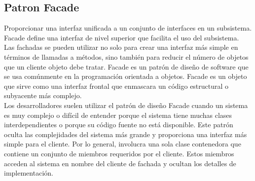 \documentclass[twoside,twocolumn]{article}
\begin{document}
\subsection{Patron Facade}
Proporcionar una interfaz unificada a un conjunto de interfaces en un subsistema. Facade define una interfaz de nivel superior que facilita el uso del subsistema.
\\
Las fachadas se pueden utilizar no solo para crear una interfaz más simple en términos
de llamadas a métodos, sino también para reducir el número de objetos que un cliente
objeto debe tratar. Facade es un patrón de diseño de software que se usa comúnmente en la programación orientada a objetos. Facade es un objeto que sirve como una interfaz frontal que enmascara un código estructural o subyacente más complejo.
\\
Los desarrolladores suelen utilizar el patrón de diseño Facade cuando un sistema es muy complejo o difícil de entender porque el sistema tiene muchas clases interdependientes o porque su código fuente no está disponible. Este patrón oculta las complejidades del sistema más grande y proporciona una interfaz más simple para el cliente. Por lo general, involucra una sola clase contenedora que contiene un conjunto de miembros requeridos por el cliente. Estos miembros acceden al sistema en nombre del cliente de fachada y ocultan los detalles de implementación.
\\
\end{document}
